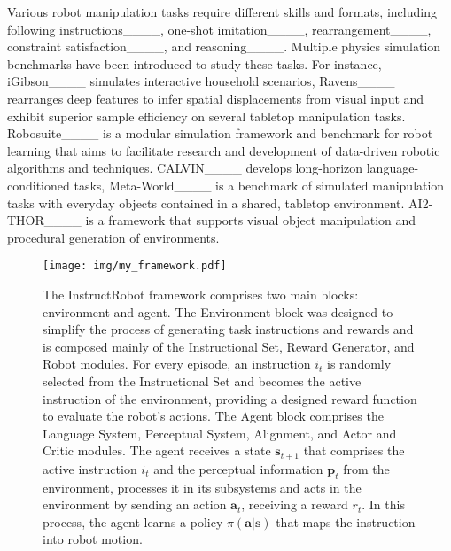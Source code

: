 Various robot manipulation tasks require different skills and formats, including following instructions____, one-shot imitation____, rearrangement____, constraint satisfaction____, and reasoning____. Multiple physics simulation benchmarks have been introduced to study these tasks. For instance, iGibson____ simulates interactive household scenarios, Ravens____ rearranges deep features to infer spatial displacements from visual input and exhibit superior sample efficiency on several tabletop manipulation tasks. Robosuite____ is a modular simulation framework and benchmark for robot learning that aims to facilitate research and development of data-driven robotic algorithms and techniques. CALVIN____ develops long-horizon language-conditioned tasks, Meta-World____ is a benchmark of simulated manipulation tasks with everyday objects contained in a shared, tabletop environment. AI2-THOR____ is a framework that supports visual object manipulation and procedural generation of environments.

\begin{figure*}[b!]
\centering
    \texttt{[image: img/my\_framework.pdf]}\hfill
    \caption{The InstructRobot framework comprises two main blocks: environment and agent. The Environment block was designed to simplify the process of generating task instructions and rewards and is composed mainly of the Instructional Set, Reward Generator, and Robot modules. For every episode, an instruction $i_t$ is randomly selected from the Instructional Set and becomes the active instruction of the environment, providing a designed reward function to evaluate the robot's actions. The Agent block comprises the Language System, Perceptual System, Alignment, and Actor and Critic modules. The agent receives a state $\textbf{s}_{t+1}$ that comprises the active instruction $i_t$ and the perceptual information $\textbf{p}_t$ from the environment, processes it in its subsystems and acts in the environment by sending an action $\textbf{a}_t$, receiving a reward $r_t$. In this process, the agent learns a policy $\pi(\textbf{a}|\textbf{s})$ that maps the instruction into robot motion.}
    \label{fig:all_framework}
\end{figure*}

